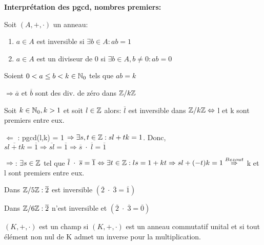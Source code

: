 \newpage

\textbf{Interprétation des pgcd, nombres premiers:}

\begin{defn}
Soit $(A,+,\cdot)$ un anneau:
	\begin{enumerate}
		\item $a \in A$ est inversible si $\exists b \in A: ab=1$
		\item $a \in A$ est un diviseur de 0 si $\exists b \in A, b \neq 0 : ab = 0$
	\end{enumerate}
\end{defn}

\begin{exmp}
Soient $0 < a \leq b < k \in \mathbb{N}_0$ tels que $ab = k$

\hspace{-0.55cm}$\Rightarrow \overline{a}$ et $\overline{b}$ sont des div. de zéro dans $\mathbb{Z}/k\mathbb{Z}$
\end{exmp}

\begin{prop}[\textcolor{red}{ATTENTION! Cette proposition fait partie de ceux à connaitre par coeur à l'examen! (pour l'année 2015-2016)}]
Soit $k \in \mathbb{N}_0, k > 1$ et soit $l \in \mathbb{Z}$ alors: $\overline{l}$ est inversible dans $\mathbb{Z}/k\mathbb{Z} \Leftrightarrow$ l et k sont premiers entre eux.
\end{prop}

\begin{demo}
$\Leftarrow$ : pgcd(l,k) = 1 $\Rightarrow \exists s,t \in \mathbb{Z}: sl + tk = 1$. Donc, $\overline{sl+tk} = \overline{1} \Rightarrow \overline{sl} = \overline{1} \Rightarrow \overline{s}\; \cdot \; \overline{l} = \overline{1}$ 

\hspace{-0.55cm}$\Rightarrow$: $\exists s \in \mathbb{Z}$ tel que $\overline{l} \; \cdot \; \overline{s} = \overline{1} \Leftrightarrow \exists t \in \mathbb{Z}: ls= 1 + kt \Rightarrow sl + (-t)k = 1 \overset{Bezout}{\Rightarrow}$ k et l sont premiers entre eux.
\end{demo}

\begin{exmp}
Dans $\mathbb{Z}/5\mathbb{Z}: \overline{2}$ est inversible $(\overline{2}\;\cdot\;\overline{3} = \overline{1})$

\hspace{-0.55cm}Dans $\mathbb{Z}/6\mathbb{Z}: \overline{2}$ n'est inversible et $(\overline{2}\;\cdot\;\overline{3} = \overline{0})$
\end{exmp}

\begin{defn}
$(K,+,\cdot)$ est un champ si $(K,+,\cdot)$ est un anneau commutatif unital et si tout élément non nul de K admet un inverse pour la multiplication.
\end{defn}

